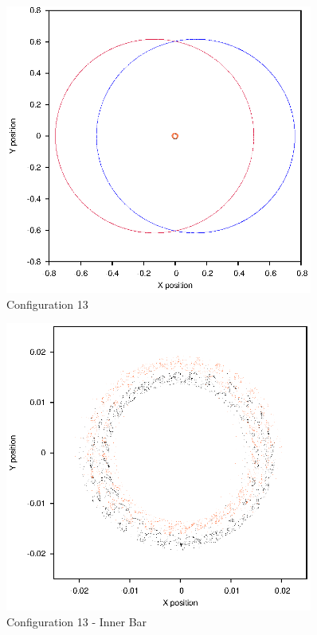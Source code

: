 \documentclass[a4paper,12pt]{article}
\begin{document}
\begin{figure}[H]
\centering
\includegraphics[width=0.9\textwidth]{./results/025-65-02/Orbit.eps}
\caption{Configuration 13}
\label{fig:config13}
\end{figure}
\begin{figure}[H]
\centering
\includegraphics[width=0.9\textwidth]{./results/025-65-02/Inner.eps}
\caption{Configuration 13 - Inner Bar}
\label{fig:config13i}
\end{figure}
\end{document}
